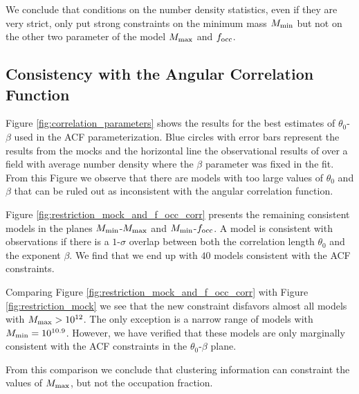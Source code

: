 \documentclass[usenatbib]{mn2e}
\begin{document}
We conclude that conditions on the number density statistics, even if they are
very strict, only put strong constraints on the minimum mass $M_{\rm
  min}$ but not on the other two parameter of the model $M_{\rm max}$
and $f_{\rm occ}$. 



\subsection{Consistency with the Angular Correlation Function}



Figure \ref{fig:correlation_parameters} shows the results for the
best estimates of $\theta_{0}$-$\beta$  used in the ACF
parameterization.  Blue circles with error bars represent the results
from the mocks and the horizontal line the observational results of
\cite{Ouchi2010} over a field with average number density where the
$\beta$ parameter was fixed in the fit. From this Figure we observe
that there are models with too large values of $\theta_0$ and $\beta$
that can be ruled out as inconsistent with the angular correlation
function. 

Figure \ref{fig:restriction_mock_and_f_occ_corr} presents the
remaining consistent models in the planes $M_{\rm min}$-$M_{\rm
  max}$ and $M_{\rm   min}$-$f_{\rm occ}$. A model is consistent with
observations if there is a $1$-$\sigma$ overlap between both the
correlation length $\theta_0$ and the exponent $\beta$.  We find that
we end up with $40$ models consistent with the ACF constraints.  

Comparing Figure
\ref{fig:restriction_mock_and_f_occ_corr} with Figure
\ref{fig:restriction_mock} we see that the new constraint disfavors
almost all models with $M_{\rm max}>10^{12}$. The only exception is 
a narrow range of models with $M_{\rm min}=10^{10.9}$. However, we
have verified that these models are only marginally consistent with
the ACF constraints in the $\theta_0$-$\beta$ plane.

From this comparison we conclude that clustering information can
constraint the values of $M_{\rm max}$, but not the occupation
fraction. 
\end{document}
